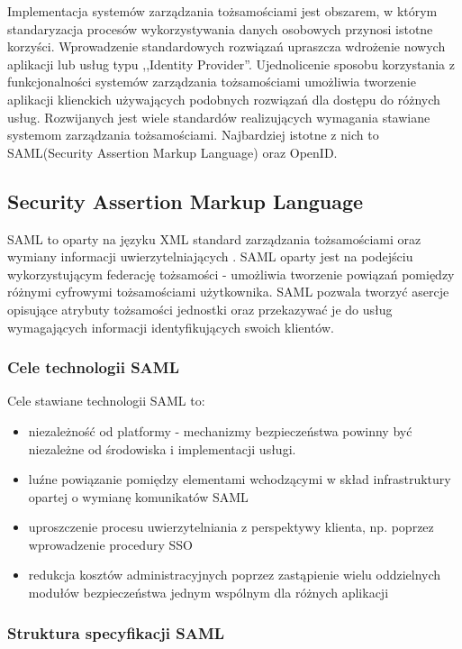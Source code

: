 Implementacja systemów zarządzania tożsamościami jest obszarem, w którym standaryzacja procesów wykorzystywania danych osobowych przynosi istotne korzyści. Wprowadzenie standardowych rozwiązań upraszcza wdrożenie nowych aplikacji lub usług typu ,,Identity Provider''. Ujednolicenie sposobu korzystania z funkcjonalności systemów zarządzania tożsamościami umożliwia tworzenie aplikacji klienckich używających podobnych rozwiązań dla dostępu do różnych usług. Rozwijanych jest wiele standardów realizujących wymagania stawiane systemom zarządzania tożsamościami. Najbardziej istotne z nich to SAML(Security Assertion Markup Language) oraz OpenID. 

\subsection{Security Assertion Markup Language}

	SAML to oparty na języku XML standard zarządzania tożsamościami oraz wymiany informacji uwierzytelniających \cite{Wisniewski05}. SAML oparty jest na podejściu wykorzystującym federację tożsamości - umożliwia tworzenie powiązań pomiędzy różnymi cyfrowymi tożsamościami użytkownika. SAML pozwala tworzyć asercje opisujące atrybuty tożsamości jednostki oraz przekazywać je do usług wymagających informacji identyfikujących swoich klientów.

	\subsubsection{Cele technologii SAML}

		Cele stawiane technologii SAML to\cite{Wisniewski05}:

		\begin{itemize}
		  \item niezależność od platformy - mechanizmy bezpieczeństwa powinny być niezależne od środowiska i implementacji usługi.
		  \item luźne powiązanie pomiędzy elementami wchodzącymi w skład infrastruktury opartej o wymianę komunikatów SAML
		  \item uproszczenie procesu uwierzytelniania z perspektywy klienta, np. poprzez wprowadzenie procedury SSO
		  \item redukcja kosztów administracyjnych poprzez zastąpienie wielu oddzielnych modułów bezpieczeństwa jednym wspólnym dla  różnych aplikacji
		\end{itemize}

	\subsubsection{Struktura specyfikacji SAML}

